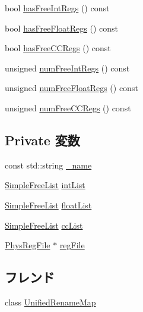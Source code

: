 \begin{DoxyCompactItemize}
\item 
bool \hyperlink{classUnifiedFreeList_a56543c33c7d2541d842191d68e28e7f5}{hasFreeIntRegs} () const 
\item 
bool \hyperlink{classUnifiedFreeList_a66fd2ab82019c46855af1540971f37c5}{hasFreeFloatRegs} () const 
\item 
bool \hyperlink{classUnifiedFreeList_a03260b1c6071ae0e6424a15195d322b1}{hasFreeCCRegs} () const 
\item 
unsigned \hyperlink{classUnifiedFreeList_a8c5be7cb6eaa4a7508a868836257dbfe}{numFreeIntRegs} () const 
\item 
unsigned \hyperlink{classUnifiedFreeList_a0d8bdfb9e786b20fb4498710d0a86675}{numFreeFloatRegs} () const 
\item 
unsigned \hyperlink{classUnifiedFreeList_a3aea090eb5006f388c8ea56397990b85}{numFreeCCRegs} () const 
\end{DoxyCompactItemize}
\subsection*{Private 変数}
\begin{DoxyCompactItemize}
\item 
const std::string \hyperlink{classUnifiedFreeList_a1b003dc5cfce1a4d8f9a0c4b9b589045}{\_\-name}
\item 
\hyperlink{classSimpleFreeList}{SimpleFreeList} \hyperlink{classUnifiedFreeList_aeafc736e9696de02d3195527f55b7470}{intList}
\item 
\hyperlink{classSimpleFreeList}{SimpleFreeList} \hyperlink{classUnifiedFreeList_a84c2a7dcff56dcaa39aefc6e77acf461}{floatList}
\item 
\hyperlink{classSimpleFreeList}{SimpleFreeList} \hyperlink{classUnifiedFreeList_abaa0000cc485f09abf2d7877a5e0b41f}{ccList}
\item 
\hyperlink{classPhysRegFile}{PhysRegFile} $\ast$ \hyperlink{classUnifiedFreeList_a1cb63957414a6c5533e779b0e6e68dd7}{regFile}
\end{DoxyCompactItemize}
\subsection*{フレンド}
\begin{DoxyCompactItemize}
\item 
class \hyperlink{classUnifiedFreeList_a0fd5167b0ca5092436903818ae92db1a}{UnifiedRenameMap}
\end{DoxyCompactItemize}


